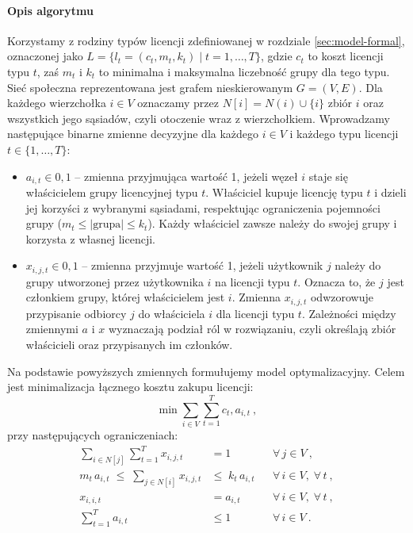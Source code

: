 \paragraph{Opis algorytmu}
Korzystamy z rodziny typów licencji zdefiniowanej w rozdziale \ref{sec:model-formal}, oznaczonej jako $L = \{{l_t = (c_t,m_t,k_t) \mid t = 1,\dots,T}\}$, gdzie $c_t$ to koszt licencji typu $t$, zaś $m_t$ i $k_t$ to minimalna i maksymalna liczebność grupy dla tego typu. Sieć społeczna reprezentowana jest grafem nieskierowanym $G = (V,E)$. Dla każdego wierzchołka $i \in V$ oznaczamy przez $N[i] = N(i) \cup \{i\}$ zbiór $i$ oraz wszystkich jego sąsiadów, czyli otoczenie wraz z wierzchołkiem. Wprowadzamy następujące binarne zmienne decyzyjne dla każdego $i \in V$ i każdego typu licencji $t \in \{1,\dots,T\}$:
\begin{itemize}\setlength{\itemsep}{1ex}
\item $a_{i,t} \in {0,1}$ -- zmienna przyjmująca wartość 1, jeżeli węzeł $i$ staje się właścicielem grupy licencyjnej typu $t$. Właściciel kupuje licencję typu $t$ i dzieli jej korzyści z wybranymi sąsiadami, respektując ograniczenia pojemności grupy ($m_t \leq |\text{grupa}| \leq k_t$). Każdy właściciel zawsze należy do swojej grupy i korzysta z własnej licencji.
\item $x_{i,j,t} \in {0,1}$ -- zmienna przyjmuje wartość 1, jeżeli użytkownik $j$ należy do grupy utworzonej przez użytkownika $i$ na licencji typu $t$. Oznacza to, że $j$ jest członkiem grupy, której właścicielem jest $i$. Zmienna $x_{i,j,t}$ odwzorowuje przypisanie odbiorcy $j$ do właściciela $i$ dla licencji typu $t$. Zależności między zmiennymi $a$ i $x$ wyznaczają podział ról w rozwiązaniu, czyli określają zbiór właścicieli oraz przypisanych im członków.
\end{itemize}

Na podstawie powyższych zmiennych formułujemy model optymalizacyjny. Celem jest minimalizacja łącznego kosztu zakupu licencji:
\begin{equation}\label{eq:ilp_obj}
\min \sum_{i \in V}\sum_{t=1}^{T} c_t,a_{i,t}~,
\end{equation}
przy następujących ograniczeniach:
\begin{align}
  \sum_{i \in N[j]} \sum_{t=1}^{T} x_{i,j,t} &= 1 
    && \forall\, j \in V~, \label{eq:ilp_cover}\\[1ex]
  m_t\,a_{i,t} \;\le\; \sum_{j \in N[i]} x_{i,j,t} &\le\; k_t\,a_{i,t} 
    && \forall\, i \in V,\;\forall\, t~, \label{eq:ilp_cap}\\[1ex]
  x_{i,i,t} &= a_{i,t} 
    && \forall\, i \in V,\;\forall\, t~, \label{eq:ilp_owner}\\[1ex]
  \sum_{t=1}^{T} a_{i,t} &\le 1 
    && \forall\, i \in V~. \label{eq:ilp_one}
\end{align}


